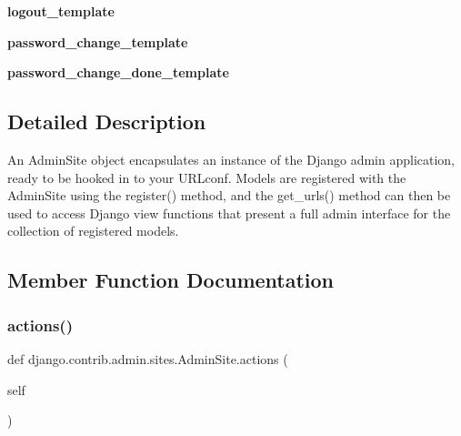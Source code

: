 \begin{DoxyCompactItemize}
\mbox{\label{classdjango_1_1contrib_1_1admin_1_1sites_1_1_admin_site_ad7bc702722ed211c2e3e4b62c95e6872}} 
{\bfseries logout\+\_\+template}
\item 
\mbox{\label{classdjango_1_1contrib_1_1admin_1_1sites_1_1_admin_site_ac7947898d920655be0c6e11603ef5dab}} 
{\bfseries password\+\_\+change\+\_\+template}
\item 
\mbox{\label{classdjango_1_1contrib_1_1admin_1_1sites_1_1_admin_site_aab1b77b67a03911a014746801cbae050}} 
{\bfseries password\+\_\+change\+\_\+done\+\_\+template}
\end{DoxyCompactItemize}


\subsection{Detailed Description}
\begin{DoxyVerb}An AdminSite object encapsulates an instance of the Django admin application, ready
to be hooked in to your URLconf. Models are registered with the AdminSite using the
register() method, and the get_urls() method can then be used to access Django view
functions that present a full admin interface for the collection of registered
models.
\end{DoxyVerb}
 

\subsection{Member Function Documentation}
\mbox{\label{classdjango_1_1contrib_1_1admin_1_1sites_1_1_admin_site_a13215f2700042f55f27bb7afe56bdc08}} 
\subsubsection{\texorpdfstring{actions()}{actions()}}
{\footnotesize\ttfamily def django.\+contrib.\+admin.\+sites.\+Admin\+Site.\+actions (\begin{DoxyParamCaption}\item[{}]{self }\end{DoxyParamCaption})}

